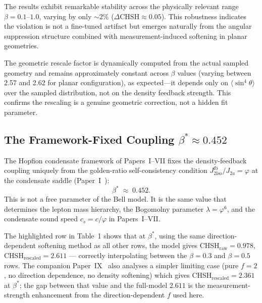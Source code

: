 The results exhibit remarkable stability across the physically relevant range $\beta = 0.1$--$1.0$, varying by only $\sim 2\%$ ($\Delta\mathrm{CHSH} \approx 0.05$). This robustness indicates the violation is not a fine-tuned artifact but emerges naturally from the angular suppression structure combined with measurement-induced softening in planar geometries.

The geometric rescale factor is dynamically computed from the actual sampled geometry and remains approximately constant across $\beta$ values (varying between 2.57 and 2.62 for planar configuration), as expected---it depends only on $\langle \sin^4\theta \rangle$ over the sampled distribution, not on the density feedback strength. This confirms the rescaling is a genuine geometric correction, not a hidden fit parameter.

\subsection*{The Framework-Fixed Coupling $\beta^* \approx 0.452$}

The Hopfion condensate framework of Papers~I--VII fixes the density-feedback
coupling uniquely from the golden-ratio self-consistency condition
$J_{2\mathrm{iso}}^{\mathrm{fb}}/J_{2a} = \varphi$ at the condensate saddle (Paper~I~\cite{Paper1}):
\begin{equation}
  \beta^* \;\approx\; 0.452.
  \label{P8:eq:beta_star}
\end{equation}
This is not a free parameter of the Bell model.
It is the same value that determines the lepton mass hierarchy, the Bogomolny
parameter $\lambda = \varphi^6$, and the condensate sound speed $c_s = c/\varphi$
in Papers~I--VII.

The highlighted row in Table~1 shows that at $\beta^*$, using the same
direction-dependent softening method as all other rows, the model gives
CHSH$_\mathrm{raw} = 0.978$, CHSH$_\mathrm{rescaled} = 2.611$ --- correctly
interpolating between the $\beta=0.3$ and $\beta=0.5$ rows.
The companion Paper~IX~\cite{Paper9} also analyses a simpler limiting case (pure
$f=2$, no direction dependence, no density softening) which gives
CHSH$_\mathrm{rescaled}=2.361$ at $\beta^*$; the gap between that value and
the full-model $2.611$ is the measurement-strength enhancement from the
direction-dependent $f$ used here.

